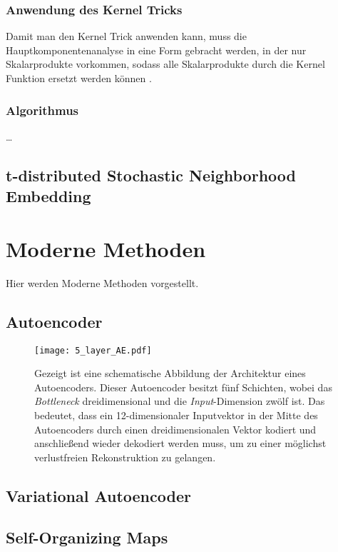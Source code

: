 \subsubsection{Anwendung des Kernel Tricks}
\label{ch:MethodenDerDimRed:traditionell:kPCA:AnwendungKernelTrick}
Damit man den Kernel Trick anwenden kann, muss die Hauptkomponentenanalyse in eine Form gebracht werden, in der nur Skalarprodukte vorkommen, sodass alle Skalarprodukte durch die Kernel Funktion ersetzt werden können \parencite[586]{Bishop.2006}.


\subsubsection{Algorithmus}
\label{ch:MethodenDerDimRed:traditionell:kPCA:Algorithmus}
\ldots



\subsection{t-distributed Stochastic Neighborhood Embedding}
\label{ch:MethodenDerDimRed:traditionell:t-SNE}

\newpage

\section{Moderne Methoden}
\label{ch:MethodenDerDimRed:modern}
Hier werden Moderne Methoden vorgestellt.

\subsection{Autoencoder}
\label{ch:MethodenDerDimRed:modern:AE}

\begin{figure}[h]
	\label{fig:5-layer-Autoencoder}
	\begin{center}
		\texttt{[image: 5\_layer\_AE.pdf]}
		\caption[Schematische Abbildung der Architektur eines Autoencoders]{Gezeigt ist eine schematische Abbildung der Architektur eines Autoencoders. Dieser Autoencoder besitzt fünf Schichten, wobei das \textit{Bottleneck} dreidimensional und die \textit{Input}-Dimension zwölf ist. Das bedeutet, dass ein 12-dimensionaler Inputvektor in der Mitte des Autoencoders durch einen dreidimensionalen Vektor kodiert und anschließend wieder dekodiert werden muss, um zu einer möglichst verlustfreien Rekonstruktion zu gelangen.}
	\end{center}
\end{figure}

\subsection{Variational Autoencoder}
\label{ch:MethodenDerDimRed:modern:VAE}

\subsection{Self-Organizing Maps}
\label{ch:MethodenDerDimRed:modern:SOM}
